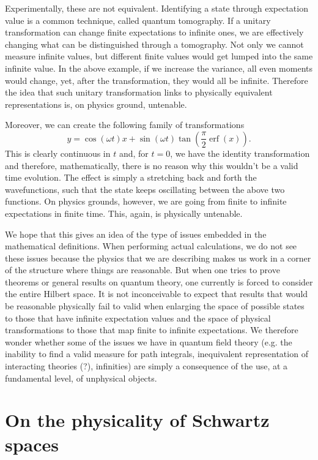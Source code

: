 \documentclass[10pt,twocolumn, nofootinbib]{revtex4-2}
\DeclareMathOperator{\erf}{erf}
\begin{document}
Experimentally, these are not equivalent. Identifying a state through expectation value is a common technique, called quantum tomography. If a unitary transformation can change finite expectations to infinite ones, we are effectively changing what can be distinguished through a tomography. Not only we cannot measure infinite values, but different finite values would get lumped into the same infinite value. In the above example, if we increase the variance, all even moments would change, yet, after the transformation, they would all be infinite. Therefore the idea that such unitary transformation links to physically equivalent representations is, on physics ground, untenable.

Moreover, we can create the following family of transformations
\begin{equation}
	y = \cos(\omega t) x + \sin(\omega t) \tan \left(\frac{\pi}{2}\erf(x)\right).
\end{equation}
This is clearly continuous in $t$ and, for $t=0$, we have the identity transformation and therefore, mathematically, there is no reason why this wouldn't be a valid time evolution. The effect is simply a stretching back and forth the wavefunctions, such that the state keeps oscillating between the above two functions. On physics grounds, however, we are going from finite to infinite expectations in finite time. This, again, is physically untenable.

We hope that this gives an idea of the type of issues embedded in the mathematical definitions. When performing actual calculations, we do not see these issues because the physics that we are describing makes us work in a corner of the structure where things are reasonable. But when one tries to prove theorems or general results on quantum theory, one currently is forced to consider the entire Hilbert space. It is not inconceivable to expect that results that would be reasonable physically fail to valid when enlarging the space of possible states to those that have infinite expectation values and the space of physical transformations to those that map finite to infinite expectations. We therefore wonder whether some of the issues we have in quantum field theory (e.g. the inability to find a valid measure for path integrals, inequivalent representation of interacting theories (?), infinities) are simply a consequence of the use, at a fundamental level, of unphysical objects.

\section{On the physicality of Schwartz spaces}
\end{document}
